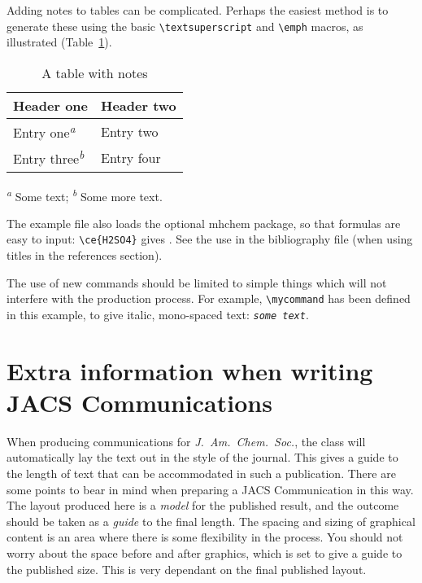 \documentclass[journal=jacsat,manuscript=article]{achemso}
\newcommand*\mycommand[1]{\texttt{\emph{#1}}}
\begin{document}
Adding notes to tables can be complicated.  Perhaps the easiest
method is to generate these using the basic
\texttt{\textbackslash textsuperscript} and
\texttt{\textbackslash emph} macros, as illustrated (Table~\ref{tbl:notes}).
\begin{table}
  \caption{A table with notes}
  \label{tbl:notes}
  \begin{tabular}{ll}
    \hline
    Header one                            & Header two \\
    \hline
    Entry one\textsuperscript{\emph{a}}   & Entry two  \\
    Entry three\textsuperscript{\emph{b}} & Entry four \\
    \hline
  \end{tabular}

  \textsuperscript{\emph{a}} Some text;
  \textsuperscript{\emph{b}} Some more text.
\end{table}

The example file also loads the optional \textsf{mhchem} package, so
that formulas are easy to input: \texttt{\textbackslash ce\{H2SO4\}}
gives .  See the use in the bibliography file (when using
titles in the references section).

The use of new commands should be limited to simple things which will
not interfere with the production process.  For example,
\texttt{\textbackslash mycommand} has been defined in this example,
to give italic, mono-spaced text: \mycommand{some text}.

\section{Extra information when writing JACS Communications}

When producing communications for \emph{J.~Am.\ Chem.\ Soc.}, the
class will automatically lay the text out in the style of the
journal. This gives a guide to the length of text that can be
accommodated in such a publication. There are some points to bear in
mind when preparing a JACS Communication in this way.  The layout
produced here is a \emph{model} for the published result, and the
outcome should be taken as a \emph{guide} to the final length. The
spacing and sizing of graphical content is an area where there is
some flexibility in the process.  You should not worry about the
space before and after graphics, which is set to give a guide to the
published size. This is very dependant on the final published layout.
\end{document}
